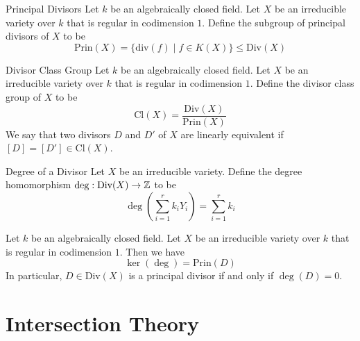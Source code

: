 \documentclass[a4paper]{article}
\begin{document}
\begin{defn}{Principal Divisors}{} Let $k$ be an algebraically closed field. Let $X$ be an irreducible variety over $k$ that is regular in codimension $1$. Define the subgroup of principal divisors of $X$ to be $$\text{Prin}(X)=\{\text{div}(f)\;|\;f\in K(X)\}\leq\text{Div}(X)$$
\end{defn}

\begin{defn}{Divisor Class Group}{} Let $k$ be an algebraically closed field. Let $X$ be an irreducible variety over $k$ that is regular in codimension $1$. Define the divisor class group of $X$ to be $$\text{Cl}(X)=\frac{\text{Div}(X)}{\text{Prin}(X)}$$ We say that two divisors $D$ and $D'$ of $X$ are linearly equivalent if $[D]=[D']\in\text{Cl}(X)$. 
\end{defn}

\begin{defn}{Degree of a Divisor}{} Let $X$ be an irreducible variety. Define the degree homomorphism $\deg:\text{Div}(X)\to\mathbb{Z}$ to be $$\deg\left(\sum_{i=1}^rk_iY_i\right)=\sum_{i=1}^rk_i$$ 
\end{defn}

\begin{prp}{}{} Let $k$ be an algebraically closed field. Let $X$ be an irreducible variety over $k$ that is regular in codimension $1$. Then we have $$\ker(\deg)=\text{Prin}(D)$$ In particular, $D\in\text{Div}(X)$ is a principal divisor if and only if $\deg(D)=0$. 
\end{prp}

\pagebreak
\section{Intersection Theory}
\end{document}

